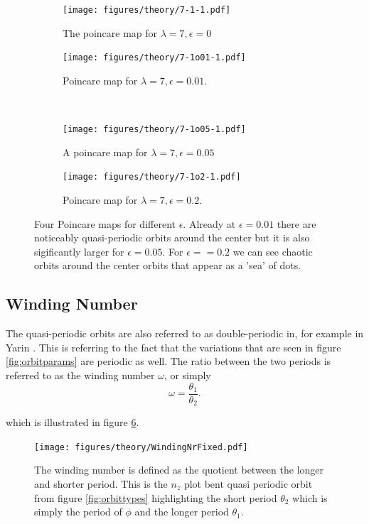 \begin{figure}[H]
\centering
\begin{subfigure}[3a]{0.40\textwidth}
\texttt{[image: figures/theory/7-1-1.pdf]}
\caption{The poincare map for $\lambda = 7, \epsilon = 0$}\label{fig:orbitmap1}
\end{subfigure}\hspace{1em}%
\begin{subfigure}[3b]{0.40\textwidth}
\texttt{[image: figures/theory/7-1o01-1.pdf]}
\caption{Poincare map for $\lambda = 7, \epsilon = 0.01$.}\label{fig:orbitmap2}
\end{subfigure} \\
\begin{subfigure}[3a]{0.40\textwidth}
\texttt{[image: figures/theory/7-1o05-1.pdf]}
\caption{A poincare map for $\lambda = 7, \epsilon = 0.05$}\label{fig:orbitmap3}
\end{subfigure}\hspace{1em}%
\begin{subfigure}[3b]{0.40\textwidth}
\texttt{[image: figures/theory/7-1o2-1.pdf]}
\caption{Poincare map for $\lambda = 7, \epsilon = 0.2$.}\label{fig:orbitmap4}
\end{subfigure} 
\caption{Four Poincare maps for different $\epsilon$. Already at $\epsilon = 0.01$ there are noticeably quasi-periodic orbits around the center but it is also sigificantly larger for $\epsilon = 0.05$. For $\epsilon == 0.2$ we can see chaotic orbits around the center orbits that appear as a 'sea' of dots.}\label{fig:orbitmaps}
\end{figure}

\subsection{Winding Number} \label{sec:winding}
The quasi-periodic orbits are also referred to as double-periodic in, for example in Yarin \cite{Yarin}. This is referring to the fact that the variations that are seen in figure \ref{fig:orbitparams} are periodic as well. The ratio between the two periods is referred to as the winding number $\omega$, or simply
\begin{equation}\label{eq:winding}
\omega = \frac{\theta_1}{\theta_2}.
\end{equation}

which is illustrated in figure \ref{fig:windingDef}.

\begin{figure}[H]
\begin{center}
\texttt{[image: figures/theory/WindingNrFixed.pdf]}
\end{center}
\caption{The winding number is defined as the quotient between the longer and shorter period. This is the $n_z$ plot bent quasi periodic orbit from figure \ref{fig:orbittypes} highlighting the short period $\theta_2$ which is simply the period of $\phi$ and the longer period $\theta_1$.}
\label{fig:windingDef}
\end{figure}


